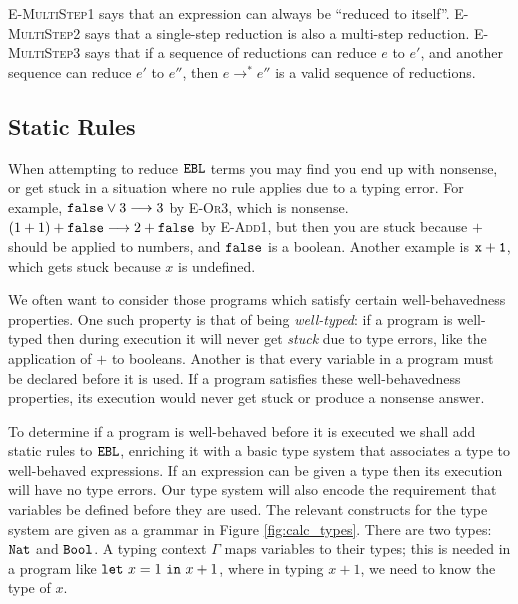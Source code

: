 \textsc{E-MultiStep1} says that an expression can always be ``reduced to itself''. \textsc{E-MultiStep2} says that a single-step reduction is also a multi-step reduction. \textsc{E-MultiStep3} says that if a sequence of reductions can reduce $e$ to $e'$, and another sequence can reduce $e'$ to $e''$, then $e \longrightarrow^* e''$ is a valid sequence of reductions.




\subsection{Static Rules}

When attempting to reduce $\mathtt{EBL}$ terms you may find you end up with nonsense, or get stuck in a situation where no rule applies due to a typing error. For example, $\mathtt{false} \lor 3 \longrightarrow 3$ by \textsc{E-Or3}, which is nonsense. $(1+1)+\mathtt{false} \longrightarrow 2 + \mathtt{false}$ by \textsc{E-Add1}, but then you are stuck because $+$ should be applied to numbers, and $\mathtt{false}$ is a boolean. Another example is $\mathtt{x+1}$, which gets stuck because $x$ is undefined.

We often want to consider those programs which satisfy certain well-behavedness properties. One such property is that of being \textit{well-typed}: if a program is well-typed then during execution it will never get \textit{stuck} due to type errors, like the application of $+$ to booleans. Another is that every variable in a program must be declared before it is used. If a program satisfies these well-behavedness properties, its execution would never get stuck or produce a nonsense answer.

To determine if a program is well-behaved before it is executed we shall add static rules to $\mathtt{EBL}$, enriching it with a basic type system that associates a type to well-behaved expressions. If an expression can be given a type then its execution will have no type errors. Our type system will also encode the requirement that variables be defined before they are used. The relevant constructs for the type system are given as a grammar in Figure \ref{fig:calc_types}. There are two types: $\mathtt{Nat}$ and $\mathtt{Bool}$. A typing context $\Gamma$ maps variables to their types; this is needed in a program like $\mathtt{let}~ x = 1~\mathtt{in}~ x+1$, where in typing $x+1$, we need to know the type of $x$.

